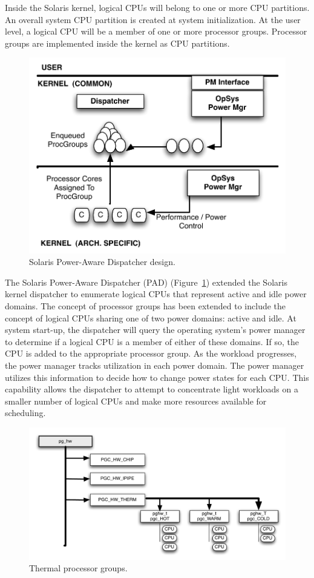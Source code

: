\documentclass[acmtaco]{acmtrans2m}
\begin{document}
Inside the Solaris kernel, logical CPUs will belong to one or more CPU
partitions.  An overall system CPU partition is created at system
initialization.  At the user level, a logical CPU will be a member of
one or more processor groups.  Processor groups are implemented inside
the kernel as CPU partitions.
\begin{figure}
  \centering
  \includegraphics[scale=0.40]{padarch.pdf}
  \caption{Solaris Power-Aware Dispatcher design.}
  \label{fig:padarch}
\end{figure}
The Solaris Power-Aware Dispatcher (PAD) (Figure~\ref{fig:padarch})
\cite{Sun2009} extended the Solaris kernel dispatcher to enumerate
logical CPUs that represent active and idle power domains.  The concept
of processor groups has been extended to include the concept of logical
CPUs sharing one of two power domains: active and idle.  At system
start-up, the dispatcher will query the operating system's power manager
to determine if a logical CPU is a member of either of these domains.
If so, the CPU is added to the appropriate processor group.  As the
workload progresses, the power manager tracks utilization in each power
domain.  The power manager utilizes this information to decide how to
change power states for each CPU.  This capability allows the dispatcher
to attempt to concentrate light workloads on a smaller number of logical
CPUs and make more resources available for scheduling.

\begin{figure}[htbp]
  \centering
  \includegraphics[scale=0.40]{procgroup.pdf}
  \caption{Thermal processor groups.}
  \label{fig:thpg}
\end{figure}
\end{document}
